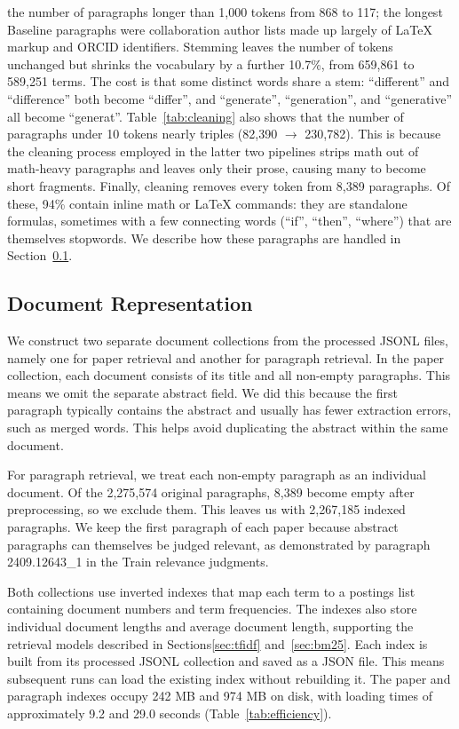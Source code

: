 \documentclass[sigconf,nonacm]{acmart}
\begin{document}
the number of paragraphs longer than 1,000 tokens from 868 to 117; the
longest Baseline paragraphs were collaboration author lists made up
largely of \LaTeX{} markup and ORCID identifiers. Stemming leaves the
number of tokens unchanged but shrinks the vocabulary by a further
10.7\%, from 659,861 to 589,251 terms. The cost is that some distinct
words share a stem: ``different'' and ``difference'' both become
``differ'', and ``generate'', ``generation'', and ``generative'' all
become ``generat''. Table~\ref{tab:cleaning} also shows that the number
of paragraphs under 10 tokens nearly triples (82,390 $\rightarrow$ 230,782). 
This is because the cleaning process employed in the latter two pipelines
strips math out of math-heavy paragraphs and leaves only their prose, causing
many to become short fragments. Finally, cleaning removes every token from 8,389 
paragraphs. Of these, 94\% contain inline math or \LaTeX{} commands: 
they are standalone formulas, sometimes with a few connecting words 
(``if'', ``then'', ``where'') that are themselves stopwords. We describe 
how these paragraphs are handled in Section~\ref{sec:docrep}.

\subsection{Document Representation}
\label{sec:docrep}
We construct two separate document collections from the processed JSONL files, namely one for paper retrieval and another for paragraph retrieval. In the paper collection, each document consists of its title and all non-empty paragraphs. This means we omit the separate abstract field. We did this because the first paragraph typically contains the abstract and usually has fewer extraction errors, such as merged words. This helps avoid duplicating the abstract within the same document. 

For paragraph retrieval, we treat each non-empty paragraph as an individual document. Of the 2,275,574 original paragraphs, 8,389 become empty after preprocessing, so we exclude them. This leaves us with 2,267,185 indexed paragraphs. We keep the first paragraph of each paper because abstract paragraphs can themselves be judged relevant, as demonstrated by paragraph 2409.12643\_1 in the Train relevance judgments. 

Both collections use inverted indexes that map each term to a postings list containing document numbers and term frequencies. The indexes also store individual document lengths and average document length, supporting the retrieval models described in Sections\ref{sec:tfidf} and~\ref{sec:bm25}. Each index is built from its processed JSONL collection and saved as a JSON file. This means subsequent runs can load the existing index without rebuilding it. The paper and paragraph indexes occupy 242 MB and 974 MB on disk, with loading times of approximately 9.2 and 29.0 seconds (Table~\ref{tab:efficiency}).
\end{document}
